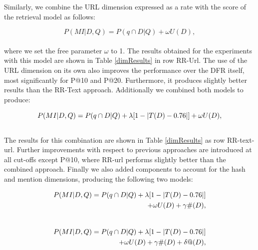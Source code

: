 Similarly, we combine the URL dimension expressed as a rate with the score of the retrieval model as follows:

\begin{equation}
P(MI|D,Q) = P(q \cap D|Q) + \omega U(D),
\label{eqUrl}
\end{equation}\\

\noindent where we set the free parameter \(\omega\) to 1. The results obtained for the experiments with this model are shown in Table \ref{dimResults} in row RR-Url. The use of the URL dimension on its own also improves the performance over the DFR itself, most significantly for P@10 and P@20. Furthermore, it produces slightly better results than the RR-Text approach. Additionally we combined both models to produce: 



\begin{equation}
P(MI|D,Q) = P(q \cap D|Q) + \lambda [1- \abs{T(D)-0.76}] + \omega U(D),
\label{eqComb}
\end{equation}\\



The results for this combination are shown in Table \ref{dimResults} as row RR-text-url. Further improvements with respect to previous approaches are introduced at all cut-offs except P@10, where RR-url performs slightly better than the combined approach. Finally we also added components to account for the hash and mention dimensions, producing the following two models:



\begin{equation}
\begin{split}
P(MI|D,Q) = P(q \cap D|Q) + \lambda [1- \abs{T(D)-0.76}] \\
 + \omega U(D) + \gamma \#(D),
\end{split}
\label{eqHash}
\end{equation}\\





\begin{equation}
\begin{split}
P(MI|D,Q) = P(q \cap D|Q) + \lambda [1- \abs{T(D)-0.76}] \\
 + \omega U(D) + \gamma \#(D) + \delta @(D),
\end{split}
\label{eqMent}
\end{equation}\\



